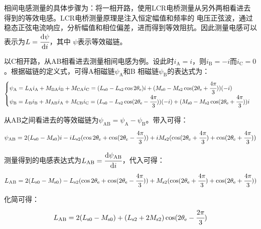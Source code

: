 相间电感测量的具体步骤为：将一相开路，使用LCR电桥测量从另外两相看进去得到的等效电感。LCR电桥测量原理是注入恒定幅值和频率的
电压正弦波，通过稳态正弦电流响应，分析幅值和相位偏差，进而得到等效阻抗。因此测量电感可以表示为\(L=\cfrac{\mathrm{d}\psi}{\mathrm{d} i}\)，其中
\(\psi\)表示等效磁链。

以C相开路，从AB相看进去测量相间电感为例。设此时\(i_{\mathrm{A}}=i\)，则\(i_{\mathrm{B}}=-i\)而\(i_{\mathrm{C}}=0\)。根据磁链的定义式，可得A相磁链\(\psi_{\mathrm{A}}\)和B
相磁链\(\psi_{\mathrm{B}}\)的表达式为：
\begin{equation*}
    \begin{cases}
        \psi_{\mathrm{A}}=L_{\mathrm{A}}i_{\mathrm{A}}+M_{\mathrm{BA}}i_{\mathrm{B}}+M_{\mathrm{CA}}i_{\mathrm{C}}=(L_{\mathrm{s0}}-L_{\mathrm{s2}}\cos2\theta_{\mathrm{e}})i+
        (M_{\mathrm{s0}}-M_{\mathrm{s2}}\cos(2\theta_{\mathrm{e}}+\cfrac{4\pi}{3}))(-i)\\
        \psi_{\mathrm{B}}=L_{\mathrm{B}}i_{\mathrm{B}}+M_{\mathrm{AB}}i_{\mathrm{A}}+M_{\mathrm{CB}}i_{\mathrm{C}}=(L_{\mathrm{s0}}-L_{\mathrm{s2}}\cos(2\theta_{\mathrm{e}}-\cfrac{4\pi}{3}))(-i)+
        (M_{\mathrm{s0}}-M_{\mathrm{s2}}\cos(2\theta_{\mathrm{e}}+\cfrac{4\pi}{3}))i
    \end{cases}
\end{equation*}

从AB之间看进去的等效磁链为\(\psi_{\mathrm{AB}}=\psi_{\mathrm{A}}-\psi_{\mathrm{B}}\)。带入可得：
\begin{equation*}
    \psi_{\mathrm{AB}}=2(L_{\mathrm{s0}}-M_{\mathrm{s0}})i
    -iL_{\mathrm{s2}}(\cos2\theta_{\mathrm{e}}+\cos(2\theta_{\mathrm{e}}-\cfrac{4\pi}{3}))
    +iM_{\mathrm{s2}}(\cos(2\theta_{\mathrm{e}}+\cfrac{4\pi}{3})+\cos(2\theta_{\mathrm{e}}+\cfrac{4\pi}{3}))
\end{equation*}

测量得到的电感表达式为\(L_{\mathrm{AB}}=\cfrac{\mathrm{d}\psi_{\mathrm{AB}}}{\mathrm{d} i}\)，代入可得：
\begin{equation*}
    L_{\mathrm{AB}}=2(L_{\mathrm{s0}}-M_{\mathrm{s0}})
    -L_{\mathrm{s2}}(\cos2\theta_{\mathrm{e}}+\cos(2\theta_{\mathrm{e}}-\cfrac{4\pi}{3}))
    +M_{\mathrm{s2}}(\cos(2\theta_{\mathrm{e}}+\cfrac{4\pi}{3})+\cos(2\theta_{\mathrm{e}}+\cfrac{4\pi}{3}))
\end{equation*}

化简可得：
\begin{equation*}
    L_{\mathrm{AB}}=2(L_{\mathrm{s0}}-M_{\mathrm{s0}})+(L_{\mathrm{s2}}+2M_{\mathrm{s2}})\cos(2\theta_{\mathrm{e}}-\cfrac{2\pi}{3})
\end{equation*}

